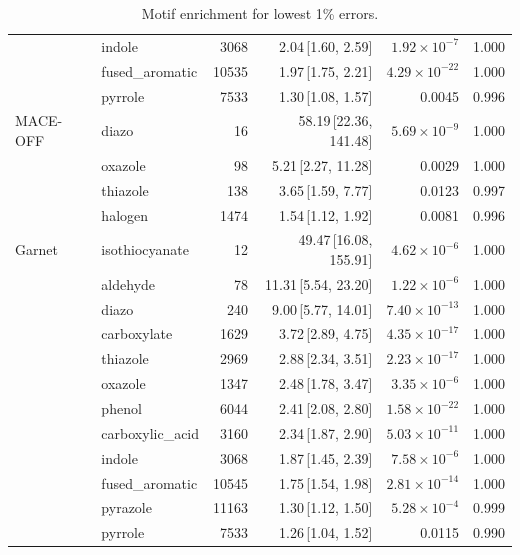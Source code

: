 \begin{table}[t]
\begin{tabular}{llrrrr}
      & indole & 3068 & 2.04\,[1.60, 2.59] & $1.92\times 10^{-7}$ & 1.000 \\
      & fused\_aromatic & 10535 & 1.97\,[1.75, 2.21] & $4.29\times 10^{-22}$ & 1.000 \\
      & pyrrole & 7533 & 1.30\,[1.08, 1.57] & 0.0045 & 0.996 \\
    \hline
    MACE-OFF & diazo & 16 & 58.19\,[22.36, 141.48] & $5.69\times 10^{-9}$ & 1.000 \\
      & oxazole & 98 & 5.21\,[2.27, 11.28] & 0.0029 & 1.000 \\
      & thiazole & 138 & 3.65\,[1.59, 7.77] & 0.0123 & 0.997 \\
      & halogen & 1474 & 1.54\,[1.12, 1.92] & 0.0081 & 0.996 \\
    \hline
    Garnet & isothiocyanate & 12 & 49.47\,[16.08, 155.91] & $4.62\times 10^{-6}$ & 1.000 \\
      & aldehyde & 78 & 11.31\,[5.54, 23.20] & $1.22\times 10^{-6}$ & 1.000 \\
      & diazo & 240 & 9.00\,[5.77, 14.01] & $7.40\times 10^{-13}$ & 1.000 \\
      & carboxylate & 1629 & 3.72\,[2.89, 4.75] & $4.35\times 10^{-17}$ & 1.000 \\
      & thiazole & 2969 & 2.88\,[2.34, 3.51] & $2.23\times 10^{-17}$ & 1.000 \\
      & oxazole & 1347 & 2.48\,[1.78, 3.47] & $3.35\times 10^{-6}$ & 1.000 \\
      & phenol & 6044 & 2.41\,[2.08, 2.80] & $1.58\times 10^{-22}$ & 1.000 \\
      & carboxylic\_acid & 3160 & 2.34\,[1.87, 2.90] & $5.03\times 10^{-11}$ & 1.000 \\
      & indole & 3068 & 1.87\,[1.45, 2.39] & $7.58\times 10^{-6}$ & 1.000 \\
      & fused\_aromatic & 10545 & 1.75\,[1.54, 1.98] & $2.81\times 10^{-14}$ & 1.000 \\
      & pyrazole & 11163 & 1.30\,[1.12, 1.50] & $5.28\times 10^{-4}$ & 0.999 \\
      & pyrrole & 7533 & 1.26\,[1.04, 1.52] & 0.0115 & 0.990 \\
    \hline
  \end{tabular}
  \caption{Motif enrichment for lowest 1\% errors.}
  \label{tab:split_impropers_best}
\end{table}
